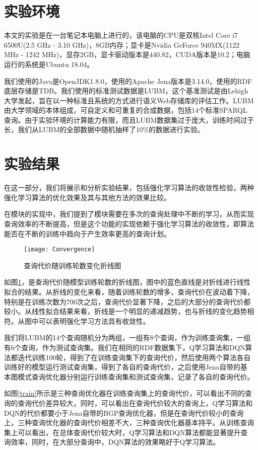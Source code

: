 \section{实验环境}
本文的实验是在一台笔记本电脑上进行的，该电脑的CPU是双核Intel Core i7 6500U(2.5 GHz - 3.10 GHz)，8GB内存；显卡是Nvidia GeForce 940MX(1122 MHz - 1242 MHz)，显存2GB，显卡驱动版本是440.82，CUDA版本是10.2；电脑运行的系统是Ubuntu 18.04。

我们使用的Java是OpenJDK1.8.0，使用的Apache Jena版本是3.14.0，使用的RDF底层存储是TDB。我们使用的标准测试数据是LUBM\cite{LUBM}，这个基准测试是由Lehigh大学发起，旨在以一种标准且系统的方式进行语义Web存储库的评估工作。LUBM由大学领域的本体组成，可自定义和可重复的合成数据，包括14个标准SPARQL查询。由于实验环境的计算能力有限，而且LUBM数据集过于庞大，训练时间过于长，我们从LUBM的全部数据中随机抽样了$10\%$的数据进行实验。
\section{实验结果}
在这一部分，我们将展示和分析实验结果，包括强化学习算法的收敛性检验，两种强化学习算法的优化效果及其与其他方法的效果比较。

在模块的实现中，我们提到了模块需要在多次的查询处理中不断的学习，从而实现查询效率的不断提高，但是这个功能的实现依赖于强化学习算法的收敛性，即算法能否在不断的训练中趋向于产生效率更高的查询计划。

\begin{figure}[h]
    \centering
    \texttt{[image: Convergence]}
    \caption{查询代价随训练轮数变化折线图}
    \label{Convergence}
\end{figure}

如图\ref{Convergence}，是查询代价随模型训练轮数的折线图，图中的蓝色直线是对折线进行线性拟合的结果。从折线的变化来看，随着训练轮数的增多，查询代价在波动着下降，特别是在训练次数为700次之后，查询代价显著下降，之后的大部分的查询代价都较小。从线性拟合结果来看，折线是一个明显的递减趋势，也与折线的变化趋势相符。从图中可以表明强化学习方法具有收敛性。

我们将LUBM的14个查询随机分为两组，一组有8个查询，作为训练查询集，一组有6个查询，作为测试查询集。我们在相同的RDF数据集下，Q学习算法和DQN算法都迭代训练100轮，得到了在训练查询集下的查询代价，然后使用两个算法各自训练好的模型运行测试查询集，得到了各自的查询代价，之后使用Jena自带的基本图模式查询优化器分别运行训练查询集和测试查询集，记录了各自的查询代价。

如图\ref{train}所示是三种查询优化器在训练查询集上的查询代价，可以看出不同的查询的查询代价差异较大，同时，可以看出在查询代价较大的查询上，Q学习算法和DQN的代价都要小于Jena自带的BGP查询优化器，但是在查询代价较小的查询上，三种查询优化器的查询代价相差不大，三种查询优化器基本持平。从训练查询集上可以看出，在总体查询代价较大时，Q学习算法和DQN算法都能显著提升查询效率，同时，在大部分查询中，DQN算法的效果略好于Q学习算法。

